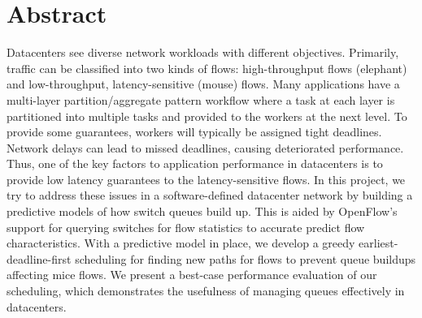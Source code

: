 \section{Abstract}
Datacenters see diverse network workloads with different objectives. Primarily, traffic can be classified into two kinds of flows: high-throughput flows (elephant) and low-throughput, latency-sensitive (mouse) flows. Many applications have a multi-layer partition/aggregate pattern workflow where a task at each layer is partitioned into multiple tasks and provided to the workers at the next level. To provide some guarantees, workers will typically be assigned tight deadlines. Network delays can lead to missed deadlines, causing deteriorated performance. Thus,
one of the key factors to application performance in datacenters is to provide low latency guarantees to the latency-sensitive flows.  In this project, we try to address these issues in a software-defined datacenter network by building a predictive
models of how switch queues build up. This is aided by OpenFlow's support for querying switches for flow
statistics to accurate predict flow characteristics. With a predictive model in place, we develop a greedy
earliest-deadline-first scheduling for finding new paths for flows to prevent queue buildups affecting mice
flows. We present a best-case performance evaluation of our scheduling, which demonstrates the usefulness
of managing queues effectively in datacenters. 
